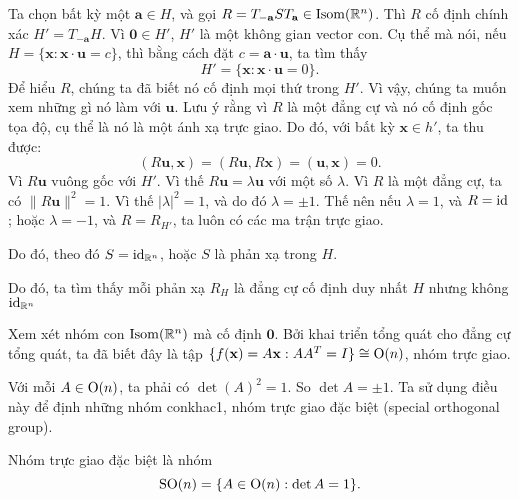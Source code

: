 \begin{eg}
  Ta chọn bất kỳ một $\mathbf{a} \in H$, và gọi $R = T_{-\mathbf{a}} S T_\mathbf{a} \in \operatorname{Isom}(\mathbb{R}^n)$. Thì $R$ cố định chính xác $H' = T_{-\mathbf{a}} H$. Vì $\mathbf{0} \in H'$, $H'$ là một không gian vector con. Cụ thể mà nói, nếu $H = \{\mathbf{x}: \mathbf{x}\cdot \mathbf{u} = c\}$, thì bằng cách đặt $c = \mathbf{a}\cdot \mathbf{u}$, ta tìm thấy
  \[
    H' = \{\mathbf{x}: \mathbf{x}\cdot \mathbf{u} = 0\}.
  \]
  Để hiểu $ R $, chúng ta đã biết nó cố định mọi thứ trong $H'$. Vì vậy, chúng ta muốn xem những gì nó làm với $\mathbf{u}$. Lưu ý rằng vì $R$ là một đẳng cự và nó cố định gốc tọa độ, cụ thể là nó là một ánh xạ trực giao. Do đó, với bất kỳ $\mathbf{x} \in h '$, ta thu được:
  \[
    (R\mathbf{u}, \mathbf{x}) = (R\mathbf{u}, R\mathbf{x}) = (\mathbf{u}, \mathbf{x}) = 0.
  \]
  Vì $R\mathbf{u}$ vuông gốc với $H'$. Vì thế $R\mathbf{u} = \lambda \mathbf{u}$ với một số $\lambda$. Vì $R$ là một đẳng cự, ta có $\|R\mathbf{u}\|^2 = 1$. Vì thế $|\lambda|^2 = 1$, và do đó $\lambda = \pm 1$. Thế nên nếu $\lambda = 1$, và $R = \operatorname{id}$; hoặc $\lambda = -1$, và $R = R_{H'}$, ta luôn có các ma trận trực giao.

  Do đó, theo đó $S = \operatorname{id}_{\mathbb{R}^n} $, hoặc $S$ là phản xạ trong $H$.
  
  Do đó, ta tìm thấy mỗi phản xạ $R_H$ là đẳng cự cố định duy nhất $H$ nhưng không $\operatorname{id}_{\mathbb{R}^n}$
\end{eg}

Xem xét nhóm con $\operatorname{Isom}(\mathbb{R}^n)$ mà cố định $\mathbf{0}$. Bởi khai triển tổng quát cho đẳng cự tổng quát, ta đã biết đây là tập $\{f(\mathbf{x}) = A\mathbf{x}: A A^T = I\} \cong \mathrm{O}(n)$, nhóm trực giao. 

Với mỗi $A \in \mathrm{O}(n)$, ta phải có $\det(A)^2 = 1$. So $\det A = \pm 1$. Ta sử dụng điều này để định những nhóm conkhac1, nhóm trực giao đặc biệt (special orthogonal group).
\begin{defi}
  Nhóm trực giao đặc biệt là nhóm
  \[
    \mathrm{SO}(n) = \{A \in \mathrm{O}(n):\det A = 1\}.
  \]
\end{defi}

